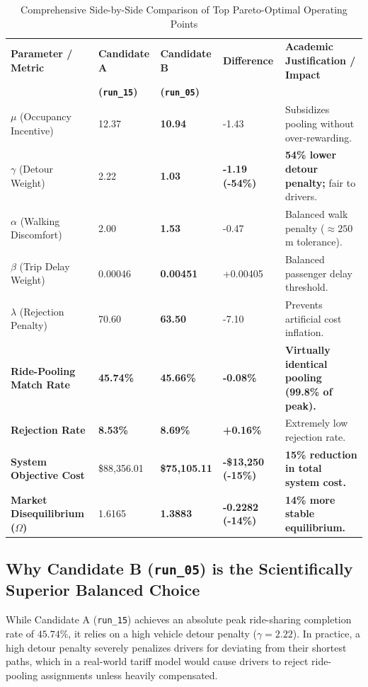 \documentclass[11pt,a4paper]{article}
\begin{document}
\begin{table}[htbp]
\centering
\caption{Comprehensive Side-by-Side Comparison of Top Pareto-Optimal Operating Points}
\label{tab:pareto_comp}
\vspace{0.5em}
\begin{tabular}{p{3.4cm} p{1.8cm} p{1.8cm} p{1.8cm} p{4.4cm}}
\hline\hline
\textbf{Parameter / Metric} & \textbf{Candidate A} & \textbf{Candidate B} & \textbf{Difference} & \textbf{Academic Justification / Impact} \\
 & \textbf{(\texttt{run\_15})} & \textbf{(\texttt{run\_05})} &  &  \\
\hline
$\mu$ (Occupancy Incentive) & 12.37 & \textbf{10.94} & -1.43 & Subsidizes pooling without over-rewarding. \\
$\gamma$ (Detour Weight) & 2.22 & \textbf{1.03} & \textbf{-1.19 (-54\%)} & \textbf{54\% lower detour penalty;} fair to drivers. \\
$\alpha$ (Walking Discomfort)& 2.00 & \textbf{1.53} & -0.47 & Balanced walk penalty ($\approx 250$m tolerance). \\
$\beta$ (Trip Delay Weight) & 0.00046 & \textbf{0.00451} & +0.00405 & Balanced passenger delay threshold. \\
$\lambda$ (Rejection Penalty)& 70.60 & \textbf{63.50} & -7.10 & Prevents artificial cost inflation. \\
\hline
\textbf{Ride-Pooling Match Rate} & \textbf{45.74\%} & \textbf{45.66\%} & \textbf{-0.08\%} & \textbf{Virtually identical pooling (99.8\% of peak).} \\
\textbf{Rejection Rate} & \textbf{8.53\%} & \textbf{8.69\%} & \textbf{+0.16\%} & Extremely low rejection rate. \\
\textbf{System Objective Cost} & \$88,356.01 & \textbf{\$75,105.11} & \textbf{-\$13,250 (-15\%)} & \textbf{15\% reduction in total system cost.} \\
\textbf{Market Disequilibrium ($\Omega$)} & 1.6165 & \textbf{1.3883} & \textbf{-0.2282 (-14\%)} & \textbf{14\% more stable equilibrium.} \\
\hline\hline
\end{tabular}
\end{table}

\subsection{Why Candidate B (\texttt{run\_05}) is the Scientifically Superior Balanced Choice}

While Candidate A (\texttt{run\_15}) achieves an absolute peak ride-sharing completion rate of $45.74\%$, it relies on a high vehicle detour penalty ($\gamma = 2.22$). In practice, a high detour penalty severely penalizes drivers for deviating from their shortest paths, which in a real-world tariff model would cause drivers to reject ride-pooling assignments unless heavily compensated.
\end{document}
